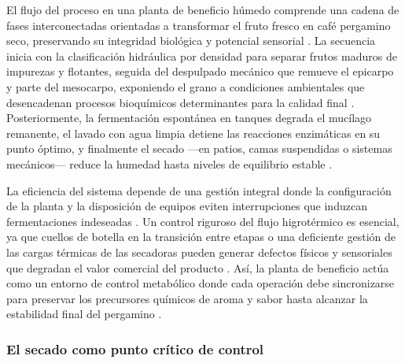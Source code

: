 El flujo del proceso en una planta de beneficio húmedo comprende una cadena de fases 
interconectadas orientadas a transformar el fruto fresco en café pergamino seco, 
preservando su integridad biológica y potencial sensorial 
\parencite{de_bruyn_exploring_2017, hasan_comparative_2024}. La secuencia inicia con 
la clasificación hidráulica por densidad para separar frutos maduros de impurezas y 
flotantes, seguida del despulpado mecánico que remueve el epicarpo y parte del 
mesocarpo, exponiendo el grano a condiciones ambientales que desencadenan procesos 
bioquímicos determinantes para la calidad final \parencite{carmo_quality_2020, 
dias_alixandre_physical_2023, ferreira_impact_2024, barbosa_sensory_2019, 
carmo_sensory_2020, osorio_hernandez_computational_2020, 
osorio_hernandez_simulation_2015}. Posteriormente, la fermentación espontánea en 
tanques degrada el mucílago remanente, el lavado con agua limpia detiene las 
reacciones enzimáticas en su punto óptimo, y finalmente el secado —en patios, camas 
suspendidas o sistemas mecánicos— reduce la humedad hasta niveles de equilibrio 
estable \parencite{de_bruyn_exploring_2017, dias_alixandre_physical_2023, 
barbosa_sensory_2019, guerra_garcia_bioclimatic_2022}.

La eficiencia del sistema depende de una gestión integral donde la configuración 
de la planta y la disposición de equipos eviten interrupciones que induzcan 
fermentaciones indeseadas \parencite{osorio_hernandez_computational_2020, 
osorio_hernandez_bioclimatic_2018}. Un control riguroso del flujo higrotérmico es 
esencial, ya que cuellos de botella en la transición entre etapas o una deficiente 
gestión de las cargas térmicas de las secadoras pueden generar defectos físicos y 
sensoriales que degradan el valor comercial del producto \parencite{barbosa_sensory_2019, 
osorio_hernandez_bioclimatic_2018, tieghi_effects_2024, guerra_garcia_bioclimatic_2022, 
osorio_hernandez_computational_2020}. Así, la planta de beneficio actúa como un 
entorno de control metabólico donde cada operación debe sincronizarse para preservar 
los precursores químicos de aroma y sabor hasta alcanzar la estabilidad final del 
pergamino \parencite{escuela_superior_politecnica_agropecuaria_de_manabi_manuel_felix_lopez_carrera_de_ingenieria_agricola_postharvest_2023, 
osorio_hernandez_simulation_2015, tieghi_effects_2024}.

\subsubsection{El secado como punto crítico de control}

